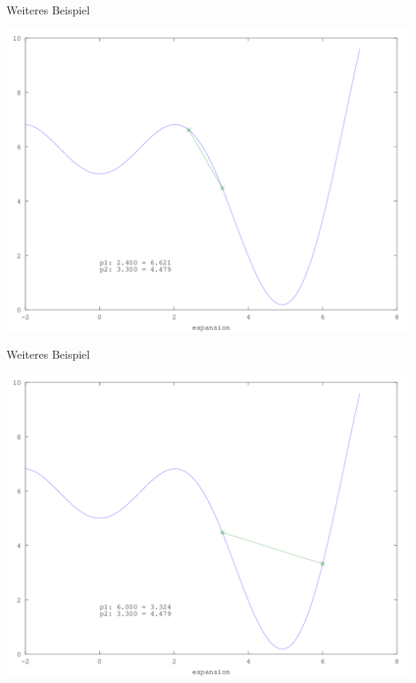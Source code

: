 \documentclass[\outputformat]{beamer}
\begin{document}
\begin{frame}{Weiteres Beispiel}
	\begin{center}
		\includegraphics[height=0.75\paperheight]{../bilder/GlobMinima/sinx_x003.png}
	\end{center}
\end{frame}
\begin{frame}{Weiteres Beispiel}
	\begin{center}
		\includegraphics[height=0.75\paperheight]{../bilder/GlobMinima/sinx_x004.png}
	\end{center}
\end{frame}
\end{document}
